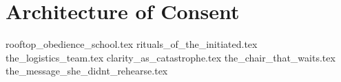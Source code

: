 \section{Architecture of Consent}


{rooftop_obedience_school.tex}
{rituals_of_the_initiated.tex}
{the_logistics_team.tex}
{clarity_as_catastrophe.tex}
{the_chair_that_waits.tex}
{the_message_she_didnt_rehearse.tex}